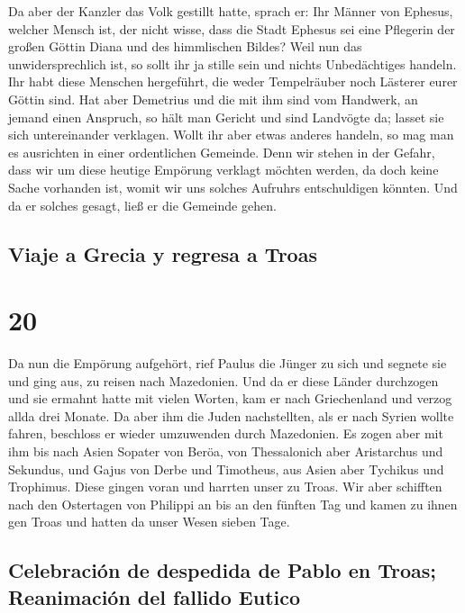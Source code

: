  Da aber der Kanzler das Volk gestillt hatte, sprach er:
Ihr Männer von Ephesus, welcher Mensch ist, der nicht wisse, dass die
Stadt Ephesus sei eine Pflegerin der großen Göttin Diana und des
himmlischen Bildes?  Weil nun das unwidersprechlich ist,
so sollt ihr ja stille sein und nichts Unbedächtiges handeln.
 Ihr habt diese Menschen hergeführt, die weder
Tempelräuber noch Lästerer eurer Göttin sind.  Hat aber
Demetrius und die mit ihm sind vom Handwerk, an jemand einen Anspruch,
so hält man Gericht und sind Landvögte da; lasset sie sich untereinander
verklagen.  Wollt ihr aber etwas anderes handeln, so mag
man es ausrichten in einer ordentlichen Gemeinde.  Denn
wir stehen in der Gefahr, dass wir um diese heutige Empörung verklagt
möchten werden, da doch keine Sache vorhanden ist, womit wir uns solches
Aufruhrs entschuldigen könnten. Und da er solches gesagt, ließ er die
Gemeinde gehen.

\hypertarget{viaje-a-grecia-y-regresa-a-troas}{%
\subsection{Viaje a Grecia y regresa a
Troas}\label{viaje-a-grecia-y-regresa-a-troas}}

\hypertarget{section-19}{%
\section{20}\label{section-19}}

 Da nun die Empörung aufgehört, rief Paulus die Jünger zu
sich und segnete sie und ging aus, zu reisen nach Mazedonien.
 Und da er diese Länder durchzogen und sie ermahnt hatte
mit vielen Worten, kam er nach Griechenland und verzog allda drei
Monate.  Da aber ihm die Juden nachstellten, als er nach
Syrien wollte fahren, beschloss er wieder umzuwenden durch Mazedonien.
 Es zogen aber mit ihm bis nach Asien Sopater von Beröa,
von Thessalonich aber Aristarchus und Sekundus, und Gajus von Derbe und
Timotheus, aus Asien aber Tychikus und Trophimus.  Diese
gingen voran und harrten unser zu Troas.  Wir aber
schifften nach den Ostertagen von Philippi an bis an den fünften Tag und
kamen zu ihnen gen Troas und hatten da unser Wesen sieben Tage.

\hypertarget{celebraciuxf3n-de-despedida-de-pablo-en-troas-reanimaciuxf3n-del-fallido-eutico}{%
\subsection{Celebración de despedida de Pablo en Troas; Reanimación del
fallido
Eutico}\label{celebraciuxf3n-de-despedida-de-pablo-en-troas-reanimaciuxf3n-del-fallido-eutico}}

